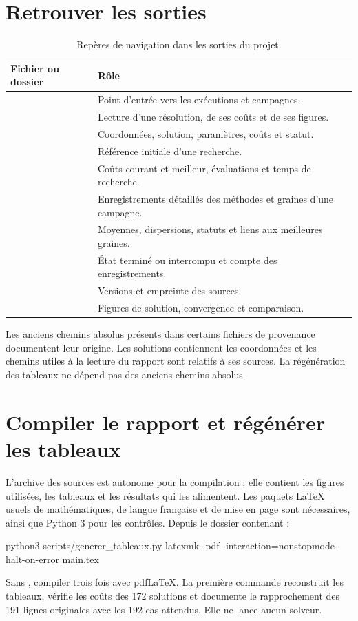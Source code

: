 \section{Retrouver les sorties}
\begin{table}[htbp]\small
\begin{tabularx}{\textwidth}{lL}\toprule
Fichier ou dossier & Rôle \\\midrule
{} & Point d'entrée vers les exécutions et campagnes. \\
 & Lecture d'une résolution, de ses coûts et de ses figures. \\
 & Coordonnées, solution, paramètres, coûts et statut. \\
 & Référence initiale d'une recherche. \\
 & Coûts courant et meilleur, évaluations et temps de recherche. \\
 & Enregistrements détaillés des méthodes et graines d'une campagne. \\
 & Moyennes, dispersions, statuts et liens aux meilleures graines. \\
 & État terminé ou interrompu et compte des enregistrements. \\
 & Versions et empreinte des sources. \\
 & Figures de solution, convergence et comparaison. \\
\bottomrule\end{tabularx}
\caption{Repères de navigation dans les sorties du projet.}
\end{table}
Les anciens chemins absolus présents dans certains fichiers de provenance
documentent leur origine. Les solutions contiennent les coordonnées et
les chemins utiles à la lecture du rapport sont relatifs à ses sources.
La régénération des tableaux ne dépend pas des anciens chemins absolus.

\section{Compiler le rapport et régénérer les tableaux}
L'archive des sources est autonome pour la compilation ; elle contient
les figures utilisées, les tableaux et les résultats qui les alimentent.
Les paquets LaTeX usuels de mathématiques, de langue française et de
mise en page sont nécessaires, ainsi que Python 3 pour les contrôles.
Depuis le dossier contenant  :
\begin{commandes}
python3 scripts/generer_tableaux.py
latexmk -pdf -interaction=nonstopmode -halt-on-error main.tex
\end{commandes}
Sans , compiler  trois fois avec pdfLaTeX.
La première commande reconstruit les tableaux, vérifie les coûts des
172 solutions et documente le rapprochement des 191 lignes originales
avec les 192 cas attendus. Elle ne lance aucun solveur.

